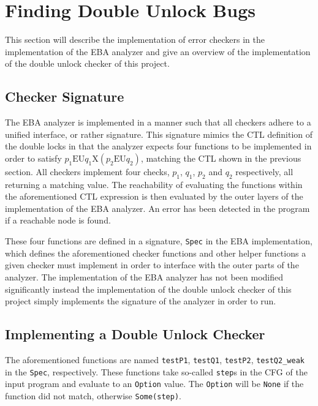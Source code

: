 \section{Finding Double Unlock Bugs}

\newpar This section will describe the implementation of error checkers in the implementation of the EBA analyzer and give an overview of the implementation of the double unlock checker of this project.

\subsection{Checker Signature}

\newpar The EBA analyzer is implemented in a manner such that all checkers adhere to a unified interface, or rather signature. This signature mimics the CTL definition of the double locks in that the analyzer expects four functions to be implemented in order to satisfy $p_1 \mathrm{EU} q_1 \mathrm{X}(p_2 \mathrm{EU} q_2)$, matching the CTL shown in the previous section. All checkers implement four checks, $p_1$, $q_1$, $p_2$ and $q_2$ respectively, all returning a matching value. The reachability of evaluating the functions within the aforementioned CTL expression is then evaluated by the outer layers of the implementation of the EBA analyzer. An error has been detected in the program if a reachable node is found. 

\newpar These four functions are defined in a signature, \texttt{Spec} in the EBA implementation, which defines the aforementioned checker functions and other helper functions a given checker must implement in order to interface with the outer parts of the analyzer. The implementation of the EBA analyzer has not been modified significantly instead the implementation of the double unlock checker of this project simply implements the signature of the analyzer in order to run. 

\subsection{Implementing a Double Unlock Checker}

\newpar The aforementioned functions are named \texttt{testP1}, \texttt{testQ1}, \texttt{testP2}, \texttt{testQ2\_weak} in the \texttt{Spec}, respectively. These functions take so-called \texttt{step}s in the CFG of the input program and evaluate to an \texttt{Option} value. The \texttt{Option} will be \texttt{None} if the function did not match, otherwise \texttt{Some(step)}. 

